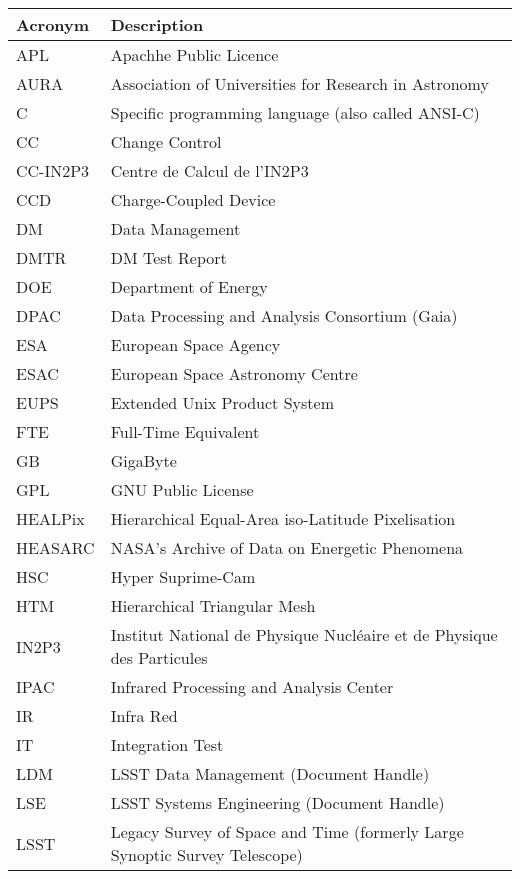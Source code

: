 \addtocounter{table}{-1}
\begin{longtable}{p{}p{}}\hline
\textbf{Acronym} & \textbf{Description}  \\\hline

APL & Apachhe Public Licence \\\hline
AURA & Association of Universities for Research in Astronomy \\\hline
C & Specific programming language (also called ANSI-C) \\\hline
CC & Change Control \\\hline
CC-IN2P3 & Centre de Calcul de l'IN2P3 \\\hline
CCD & Charge-Coupled Device \\\hline
DM & Data Management \\\hline
DMTR & DM Test Report \\\hline
DOE & Department of Energy \\\hline
DPAC & Data Processing and Analysis Consortium (Gaia) \\\hline
ESA & European Space Agency \\\hline
ESAC & European Space Astronomy Centre \\\hline
EUPS & Extended Unix Product System \\\hline
FTE & Full-Time Equivalent \\\hline
GB & GigaByte \\\hline
GPL & GNU Public License \\\hline
HEALPix & Hierarchical Equal-Area iso-Latitude Pixelisation \\\hline
HEASARC & NASA's Archive of Data on Energetic Phenomena \\\hline
HSC & Hyper Suprime-Cam \\\hline
HTM & Hierarchical Triangular Mesh \\\hline
IN2P3 & Institut National de Physique Nucléaire et de Physique des Particules \\\hline
IPAC & Infrared Processing and Analysis Center \\\hline
IR & Infra Red \\\hline
IT & Integration Test \\\hline
LDM & LSST Data Management (Document Handle) \\\hline
LSE & LSST Systems Engineering (Document Handle) \\\hline
LSST & Legacy Survey of Space and Time (formerly Large Synoptic Survey Telescope) \\\hline

\end{longtable}
